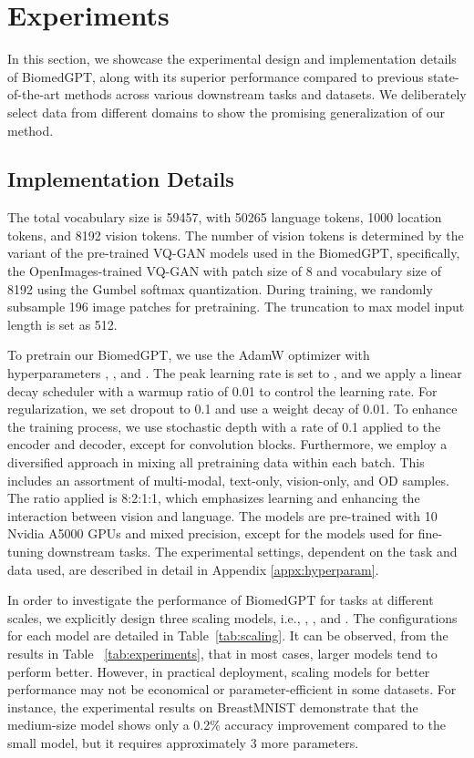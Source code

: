 \documentclass[10pt]{article} \usepackage[preprint]{tmlr}
\begin{document}
\section{Experiments}


In this section, we showcase the experimental design and implementation details of BiomedGPT, along with its superior performance compared to previous state-of-the-art methods across various downstream tasks and datasets. We deliberately select data from different domains to show the promising generalization of our method.

\subsection{Implementation Details} \label{sec:implementation}
The total vocabulary size is 59457, with 50265 language tokens, 1000 location tokens, and 8192 vision tokens. The number of vision tokens is determined by the variant of the pre-trained VQ-GAN models used in the BiomedGPT, specifically, the OpenImages\citep{kuznetsova2020open}-trained VQ-GAN with patch size of 8 and vocabulary size of 8192 using the Gumbel softmax \citep{jangcategorical2017, maddisonconcrete2017} quantization. During training, we randomly subsample 196 image patches for pretraining. The truncation to max model input length is set as 512.

To pretrain our BiomedGPT, we use the AdamW \citep{loshchilovdecoupled} optimizer with hyperparameters , , and . The peak learning rate is set to , and we apply a linear decay scheduler with a warmup ratio of 0.01 to control the learning rate. For regularization, we set dropout to 0.1 and use a weight decay of 0.01. To enhance the training process, we use stochastic depth with a rate of 0.1 applied to the encoder and decoder, except for convolution blocks. Furthermore, we employ a diversified approach in mixing all pretraining data within each batch. This includes an assortment of multi-modal, text-only, vision-only, and OD samples. The ratio applied is 8:2:1:1, which emphasizes learning and enhancing the interaction between vision and language. The models are pre-trained with 10 Nvidia A5000 GPUs and mixed precision, except for the models used for fine-tuning downstream tasks. The experimental settings, dependent on the task and data used, are described in detail in Appendix \ref{appx:hyperparam}.

In order to investigate the performance of BiomedGPT for tasks at different scales, we explicitly design three scaling models, i.e., , ,
and . The configurations for each model are detailed in Table~\ref{tab:scaling}. It can be observed, from the results in Table ~\ref{tab:experiments}, that in most cases, larger models tend to perform better. However, in practical deployment, scaling models for better performance may not be economical or parameter-efficient in some datasets. For instance, the experimental results on BreastMNIST demonstrate that the medium-size model shows only a 0.2\% accuracy improvement compared to the small model, but it requires approximately 3 more parameters. 
\end{document}
